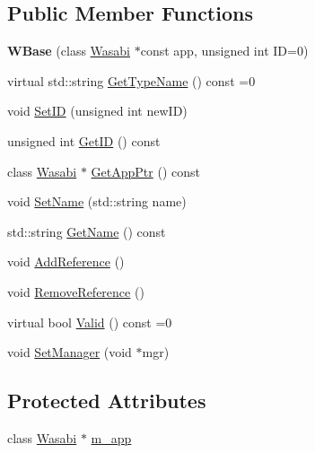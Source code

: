 \subsection*{Public Member Functions}
\begin{DoxyCompactItemize}
\item 
{\bfseries W\+Base} (class \hyperlink{class_wasabi}{Wasabi} $\ast$const app, unsigned int ID=0)\hypertarget{class_w_base_aa2d5f627a127f4ef0d476cd0e5c38d62}{}\label{class_w_base_aa2d5f627a127f4ef0d476cd0e5c38d62}

\item 
virtual std\+::string \hyperlink{class_w_base_ac5a8da5c5e7a87dee842212b3aefb507}{Get\+Type\+Name} () const  =0
\item 
void \hyperlink{class_w_base_a943b0b7eee35fcd055ffb86aad44954a}{Set\+ID} (unsigned int new\+ID)
\item 
unsigned int \hyperlink{class_w_base_ae16f9cfcd459f3430dfc0282c60fdeb3}{Get\+ID} () const 
\item 
class \hyperlink{class_wasabi}{Wasabi} $\ast$ \hyperlink{class_w_base_a6dc4e4bb84a5fc22e53116ee805b9b9e}{Get\+App\+Ptr} () const 
\item 
void \hyperlink{class_w_base_a40ebce7e237d312d5b243dda89ae10e0}{Set\+Name} (std\+::string name)
\item 
std\+::string \hyperlink{class_w_base_ad7733e483368450c774846a57e4336e2}{Get\+Name} () const 
\item 
void \hyperlink{class_w_base_a26548bcc0f7b430ef93d9b359836185a}{Add\+Reference} ()
\item 
void \hyperlink{class_w_base_a8917d59438e0ebd8352ef55497ff5be0}{Remove\+Reference} ()
\item 
virtual bool \hyperlink{class_w_base_a76ac973ba9a43e182f6a6a4869d69725}{Valid} () const  =0
\item 
void \hyperlink{class_w_base_ac01552198b0ac5874d79dc482f09357c}{Set\+Manager} (void $\ast$mgr)
\end{DoxyCompactItemize}
\subsection*{Protected Attributes}
\begin{DoxyCompactItemize}
\item 
class \hyperlink{class_wasabi}{Wasabi} $\ast$ \hyperlink{class_w_base_a1650fafeaee7a217a863b79e9bba9a08}{m\+\_\+app}
\end{DoxyCompactItemize}



